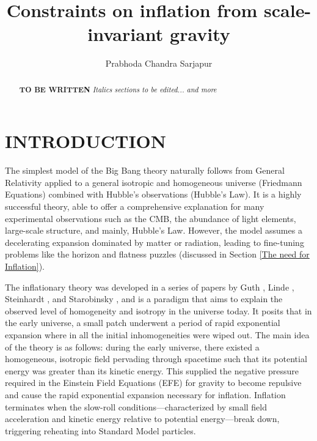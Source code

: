 \documentclass[aps,prd,reprint,preprintnumbers,showpacs,floatfix,nofootinbib,superscript address]{revtex4-2}
\begin{document}
\title{Constraints on inflation from scale-invariant gravity}

\author{Prabhoda Chandra Sarjapur}

\begin{abstract}

\textbf{TO BE WRITTEN}
\textit{Italics sections to be edited... and more}
\end{abstract}

\maketitle
\section{INTRODUCTION}

\indent The simplest model of the Big Bang theory naturally follows from General Relativity applied to a general isotropic and homogeneous universe (Friedmann Equations) combined with Hubble's observations (Hubble's Law).  It is a highly successful theory, able to offer a comprehensive explanation for many experimental observations such as the CMB, the abundance of light elements, large-scale structure, and mainly, Hubble's Law. However, the model assumes a decelerating expansion dominated by matter or radiation, leading to fine-tuning problems like the horizon and flatness puzzles (discussed in Section \ref{The need for Inflation}).


The inflationary theory was developed in a series of papers by Guth \cite{GuthOriginalPaper}, Linde \cite{LINDE1982389}, Steinhardt 
\cite{PhysRevLett.48.1220}, and Starobinsky \cite{STAROBINSKY198099}, and is a paradigm that aims to explain the observed level of homogeneity and isotropy in the universe today. It posits that in the early universe, a small patch underwent a period of rapid exponential expansion where in all the initial inhomogeneities were wiped out. The main idea of the theory is as follows: during the early universe, there existed a homogeneous, isotropic field pervading through spacetime such that its potential energy was greater than its kinetic energy. This supplied the negative pressure required in the Einstein Field Equations (EFE) for gravity to become repulsive and cause the rapid exponential expansion necessary for inflation. Inflation terminates when the slow-roll conditions—characterized by small field acceleration and kinetic energy relative to potential energy—break down, triggering reheating into Standard Model particles.
\end{document}
